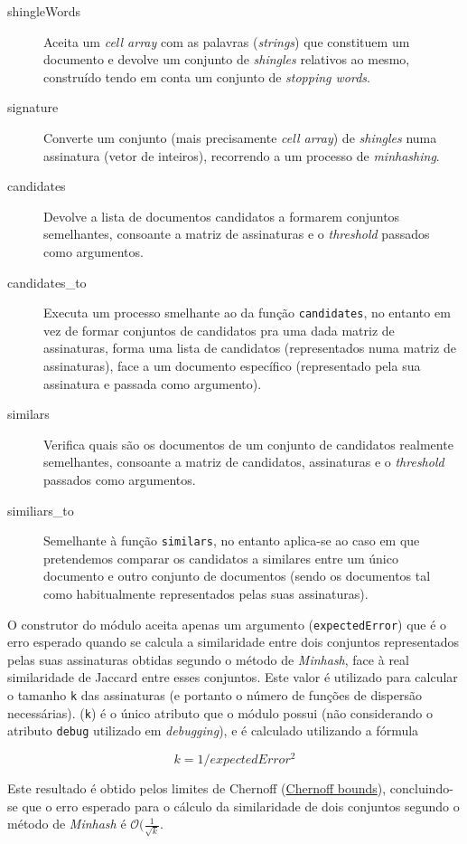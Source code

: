 \documentclass[a4paper,11pt,openright,oneside]{report}
\begin{document}
\begin{description}
\item[shingleWords]
Aceita um \textit{cell array} com as palavras (\textit{strings}) que constituem um documento e devolve um conjunto de \textit{shingles} relativos ao mesmo, construído tendo em conta um conjunto de \textit{stopping words}.
\item[signature]
Converte um conjunto (mais precisamente \textit{cell array}) de \textit{shingles} numa assinatura (vetor de inteiros), recorrendo a um processo de \textit{minhashing}.
\item[candidates]
Devolve a lista de documentos candidatos a formarem conjuntos semelhantes, consoante a matriz de assinaturas e o \textit{threshold} passados como argumentos.
\item[candidates\_to]
Executa um processo smelhante ao da função \texttt{candidates}, no entanto em vez de formar conjuntos de candidatos pra uma dada matriz de assinaturas, forma uma lista de candidatos (representados numa matriz de assinaturas), face a um documento específico (representado pela sua assinatura e passada como argumento).
\item[similars]
Verifica quais são os documentos de um conjunto de candidatos realmente semelhantes, consoante a matriz de candidatos, assinaturas e o \textit{threshold} passados como argumentos.
\item[similiars\_to]
Semelhante à função \texttt{similars}, no entanto aplica-se ao caso em que pretendemos comparar os candidatos a similares entre um único documento e outro conjunto de documentos (sendo os documentos tal como habitualmente representados pelas suas assinaturas).
\end{description}

O construtor do módulo aceita apenas um argumento (\texttt{expectedError}) que é o erro esperado quando se calcula a similaridade entre dois conjuntos representados pelas suas assinaturas obtidas segundo o método de \textit{Minhash}, face à real similaridade de Jaccard entre esses conjuntos. Este valor é utilizado para calcular o tamanho \texttt{k} das assinaturas (e portanto o número de funções de dispersão necessárias). (\texttt{k}) é o único atributo que o módulo possui (não considerando o atributo \texttt{debug} utilizado em \textit{debugging}), e é calculado utilizando a fórmula

$$ k = 1 / expectedError^2 $$

Este resultado é obtido pelos limites de Chernoff (\href{https://en.wikipedia.org/wiki/Chernoff\_bound}{Chernoff bounds}), concluindo-se que o erro esperado para o cálculo da similaridade de dois conjuntos segundo o método de \textit{Minhash} é $\mathcal{O}(\frac{1}{\sqrt{k}}$.
\end{document}
